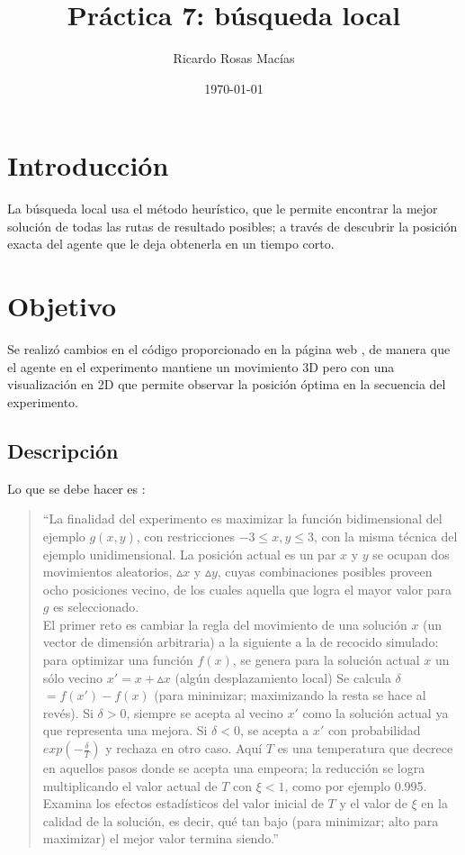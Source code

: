 \documentclass[12pt, letterpaper] {article}
\author{Ricardo Rosas Macías}
\title{Práctica 7: búsqueda local}
\date{\today}
\begin{document}
\maketitle


\section{Introducción}
La búsqueda local usa el método heur\'istico, que le permite encontrar la mejor soluci\'on de todas las rutas de resultado posibles; a trav\'es de descubrir la posición exacta del agente que le deja obtenerla en un tiempo corto.

 \section{Objetivo}
Se realizó cambios en el c\'odigo proporcionado en la p\'agina web \cite{elisawebBL}\cite{EMP7}, de manera que el agente en el experimento mantiene un movimiento 3D pero con una visualizaci\'on en 2D que permite observar la posici\'on óptima en la secuencia del experimento.
 
 \subsection{Descripción}
 
Lo que se debe hacer es \cite{elisawebBL}:
\begin{quotation}
 ``La finalidad del experimento es maximizar la funci\'on bidimensional del ejemplo $g(x,y)$, con restricciones $-3 \leq x, y \leq 3$, con la misma t\'ecnica del ejemplo unidimensional. La posici\'on actual es un par $x$ y $y$ se ocupan dos movimientos aleatorios, $\vartriangle$$x$ y $\vartriangle$$y$, cuyas combinaciones posibles proveen ocho posiciones vecino, de los cuales aquella que logra el mayor valor para $g$ es seleccionado.\\
El primer reto es cambiar la regla del movimiento de una solución $x$ (un vector de dimensión arbitraria) a la siguiente a la de recocido simulado: para optimizar una función $f(x)$, se genera para la solución actual $x$ un sólo vecino $x'=x+\vartriangle$$x$ (algún desplazamiento local) Se calcula $\delta$$=f(x')-f(x)$ (para minimizar; maximizando la resta se hace al revés). Si $\delta>0$, siempre se acepta al vecino $x'$ como la solución actual ya que representa una mejora. Si $\delta<0$, se acepta a $x'$ con probabilidad $exp(-\frac { \delta  }{ T } )$ y rechaza en otro caso. Aquí $T$ es una temperatura que decrece en aquellos pasos donde se acepta una empeora; la reducción se logra multiplicando el valor actual de $T$ con $\xi<1$, como por ejemplo 0.995. Examina los efectos estadísticos del valor inicial de $T$ y el valor de $\xi$ en la calidad de la solución, es decir, qué tan bajo (para minimizar; alto para maximizar) el mejor valor termina siendo.''
\end{quotation}
\end{document}
